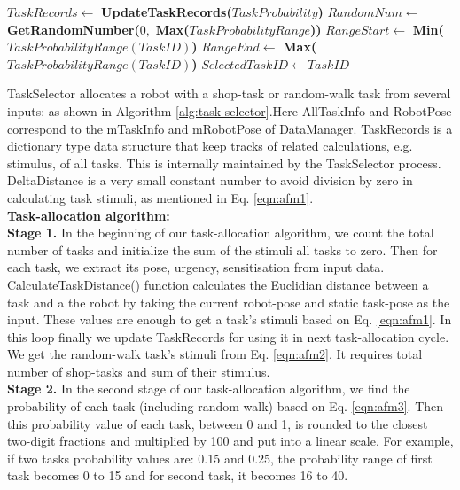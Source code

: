 \begin{algorithmic}[1]
\begin{small}
\State $ TaskRecords \gets  $ \textbf{UpdateTaskRecords(}$TaskProbability$\textbf{)}
\EndWhile
\State {}
\State $ RandomNum \gets  $ \textbf{GetRandomNumber(}$0,$ \textbf{Max(}$TaskProbabilityRange$\textbf{))}
\State $ RangeStart \gets  $ \textbf{Min(}$TaskProbabilityRange (TaskID)$\textbf{)}
\State $ RangeEnd \gets  $ \textbf{Max(}$TaskProbabilityRange (TaskID)$\textbf{)}
\State $ SelectedTaskID \gets TaskID $ 
\EndIf
\EndWhile
\end{small}
\end{algorithmic}
TaskSelector  allocates a robot with a shop-task or random-walk task from several inputs: as shown in Algorithm \ref{alg:task-selector}.Here  AllTaskInfo and RobotPose correspond to the mTaskInfo and mRobotPose of DataManager. TaskRecords is a dictionary type data structure that keep tracks of related calculations, e.g. stimulus, of all tasks. This is internally maintained by the TaskSelector process.  DeltaDistance is a very small constant number to avoid division by zero in calculating task stimuli, as mentioned in Eq. \ref{eqn:afm1}.\\
\textbf{Task-allocation algorithm:}\\
\textbf{Stage 1.} In the beginning of our task-allocation algorithm, we count the total number of tasks and initialize the sum of the stimuli all tasks to zero. Then for each task, we extract its pose, urgency, sensitisation from input data.  CalculateTaskDistance() function calculates the Euclidian distance between a task and a the robot by taking the current robot-pose and static task-pose as the input. These values are enough to get a task's stimuli based on Eq. \ref{eqn:afm1}. In this loop finally we update TaskRecords for using it in next task-allocation cycle. We get the random-walk task's stimuli from Eq. \ref{eqn:afm2}. It requires total number of shop-tasks and sum of their stimulus.\\ 
\textbf{Stage 2.} In the second stage of our task-allocation algorithm, we  find the probability of each task (including random-walk) based on Eq. \ref{eqn:afm3}. Then this probability value of each task, between 0 and 1, is rounded to the closest two-digit fractions and multiplied by 100 and put into a linear scale. For example, if two tasks probability values are: 0.15 and  0.25, the probability range of first  task becomes 0 to 15 and for second task, it becomes 16 to 40.\\
